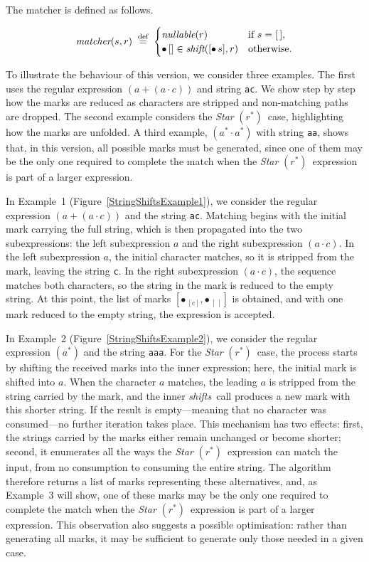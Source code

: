 \documentclass[12pt]{article}
\newcommand{\dn}{\ensuremath{\stackrel{\mbox{\scriptsize def}}{=}}}
\newcommand{\shift}{\textit{shift}}
\newcommand{\shifts}{\textit{shifts}}
\newcommand{\Marked}[1]{\bullet\,#1}
\newcommand{\nullable}{\textit{nullable}}
\newcommand{\STARText}{\textit{Star} $(r^*)$}
\newcommand{\emptylist}{[\,]}
\newcommand{\matcher}{\textit{matcher}}
\begin{document}
The matcher is defined as follows.

\[
\matcher(s, r) \; \dn\;
  \begin{cases}
    \nullable(r) & \text{if $s = \emptylist$}, \\
    \Marked{[]} \in \shift([\Marked{s}], r) & \text{otherwise.}
  \end{cases}
\]

To illustrate the behaviour of this version, we consider three examples. The first uses the
regular expression $(a + (a \cdot c))$ and string \texttt{ac}. We show step by step how the
marks are reduced as characters are stripped and non-matching paths are dropped. The second
example considers the \STARText\ case, highlighting how the marks are unfolded. A third
example, $(a^* \cdot a^*)$ with string \texttt{aa}, shows that, in this version, all possible
marks must be generated, since one of them may be the only one required to complete the match
when the \STARText\ expression is part of a larger expression.
 
In Example~1 (Figure~\ref{StringShiftsExample1}), we consider the regular expression
$(a + (a \cdot c))$ and the string \texttt{ac}. Matching begins with the initial mark carrying
the full string, which is then propagated into the two subexpressions: the left subexpression
$a$ and the right subexpression $(a \cdot c)$. In the left subexpression $a$, the initial
character matches, so it is stripped from the mark, leaving the string \texttt{c}. In the
right subexpression $(a \cdot c)$, the sequence matches both characters, so the string in the
mark is reduced to the empty string. At this point, the list of marks $[\Marked{_{[c]}},
\Marked{_{\emptylist}}]$ is obtained, and with one mark reduced to the empty string, the
expression is accepted.

In Example~2 (Figure~\ref{StringShiftsExample2}), we consider the regular expression $(a^*)$ and the
string \texttt{aaa}. For the \STARText\ case, the process starts by shifting the received marks into
the inner expression; here, the initial mark is shifted into $a$. When the character $a$ matches,
the leading $a$ is stripped from the string carried by the mark, and the inner \shifts\ call
produces a new mark with this shorter string. If the result is empty—meaning that no character was
consumed—no further iteration takes place. This mechanism has two effects: first, the strings
carried by the marks either remain unchanged or become shorter; second, it enumerates all the ways
the \STARText\ expression can match the input, from no consumption to consuming the entire string.
The algorithm therefore returns a list of marks representing these alternatives, and, as
Example~3 will show, one of these marks may be the only one required to complete the match when
the \STARText\ expression is part of a larger expression. This observation also suggests a possible
optimisation: rather than generating all marks, it may be sufficient to generate only those needed
in a given case.
\end{document}
